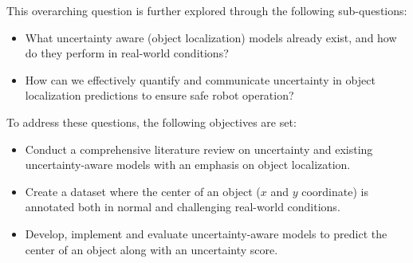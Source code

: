 This overarching question is further explored through the following sub-questions:
\begin{itemize}
    \item What uncertainty aware (object localization) models already exist, and how do they perform in real-world conditions?
    \item How can we effectively quantify and communicate uncertainty in object localization predictions to ensure safe robot operation?
\end{itemize}

To address these questions, the following objectives are set:
\begin{itemize}
    \item Conduct a comprehensive literature review on uncertainty and existing uncertainty-aware models with an emphasis on object localization.
    \item Create a dataset where the center of an object ($x$ and $y$ coordinate) is annotated both in normal and challenging real-world conditions.
    \item Develop, implement and evaluate uncertainty-aware models to predict the center of an object along with an uncertainty score.
\end{itemize}